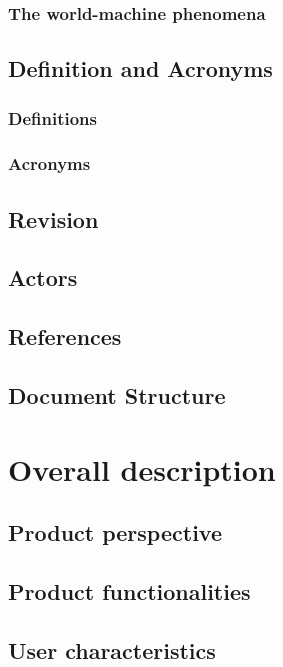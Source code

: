 \documentclass[12pt]{article}
\begin{document}
	\subsubsection{The world-machine phenomena}
	
	\clearpage
	\subsection{Definition and Acronyms}
	\subsubsection{Definitions}
	\subsubsection{Acronyms}
	\subsection{Revision}
	\subsection{Actors}
	
	\subsection{References}
	
	\clearpage
	\subsection{Document Structure}
	
	\clearpage
	\section{Overall description}
	\subsection{Product perspective}
	
	\subsection{Product functionalities}
	
	\subsection{User characteristics}
	
	
\end{document}

